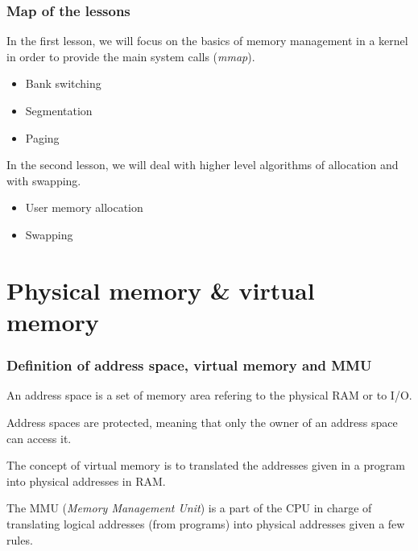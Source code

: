 \begin{frame}
  \frametitle{Map of the lessons}

  In the first lesson, we will focus on the basics of memory
  management in a kernel in order to provide the main system calls
  (\emph{mmap}).

  \begin{itemize}
  \item
    Bank switching
  \item
    Segmentation
  \item
    Paging
  \end{itemize}

  \-

  In the second lesson, we will deal with higher level algorithms of
  allocation and with swapping.

  \begin{itemize}
  \item
    User memory allocation
  \item
    Swapping
  \end{itemize}

\end{frame}

%
%

\section{Physical memory \& virtual memory}


\begin{frame}
  \frametitle{Definition of address space, virtual memory and MMU}

  An address space is a set of memory area refering to the physical
  RAM or to I/O.

  \-

  Address spaces are protected, meaning that only the owner of an
  address space can access it.

  \-

  The concept of virtual memory is to translated the addresses given
  in a program into physical addresses in RAM.

  \-

  The MMU (\emph{Memory Management Unit}) is a part of the CPU in
  charge of translating logical addresses (from programs) into
  physical addresses given a few rules.

\end{frame}

